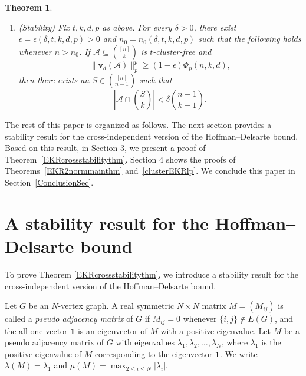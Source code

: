 \documentclass[11pt]{article}
\numberwithin{equation}{section}
\newtheorem{theorem}{Theorem}[section]
\def\A{\mathcal{A}}
\def\v{\mathbf{v}}
\begin{document}
\begin{theorem}
\begin{enumerate}[label={\rm (\alph*)}]
\begin{enumerate}[label={\rm (\roman*)}]
\item Suppose that $1\leq d\leq k-1$ and $p>2$.  Equality holds
if and only if $\A$ is a star.
\end{enumerate}

\item {\rm(Stability)} Fix $t,k,d,p$ as above.  For every
$\delta>0$, there exist
$\epsilon=\epsilon(\delta,t,k,d,p)>0$ and
$n_0=n_0(\delta,t,k,d,p)$ such that the following holds whenever
$n>n_0$.  If $\A\subseteq\binom{[n]}k$ is $t$-cluster-free and
\[
\|\v_d(\A)\|_p^p\geq
(1-\epsilon)\Phi_p(n,k,d),
\]
then there exists an $S\in\binom{[n]}{n-1}$ such that
\[
\left|\A\cap\binom Sk\right|
<\delta\binom{n-1}{k-1}.
\]
\end{enumerate}
\end{theorem}








The rest of this paper is organized as follows.
The next section provides a stability result for the cross-independent version of the Hoffman--Delsarte bound.
Based on this result, in Section 3, we present a proof of Theorem~\ref{EKRcrossstabilitythm}.
Section 4 shows the proofs of Theorems~\ref{EKR2normmainthm} and~\ref{clusterEKRlp}.
We conclude this paper in Section~\ref{ConclusionSec}.






\section{A stability result for the Hoffman--Delsarte bound}

To prove Theorem \ref{EKRcrossstabilitythm}, we introduce
a stability result for the cross-independent version of the Hoffman--Delsarte bound.




Let $G$ be an $N$-vertex graph.
A real symmetric $N\times N$ matrix $M=(M_{ij})$ is called a {\em pseudo adjacency matrix} of $G$ if $M_{ij}= 0$ whenever $\{i, j\}\notin E(G)$,
and the all-one vector $\mathbf{1}$ is an eigenvector of $M$ with a positive eigenvalue.
Let $M$ be a pseudo adjacency matrix of $G$
with eigenvalues $\lambda_1, \lambda_2, \ldots , \lambda_N$,
where $\lambda_1$ is the positive eigenvalue of $M$
corresponding to the eigenvector $\mathbf{1}$.
We write $\lambda(M)=\lambda_1$ and  $\mu (M)=\max_{2\leq i\leq N} |\lambda_i|$.
\end{document}
